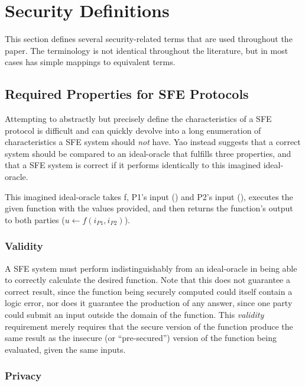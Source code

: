 \section{Security Definitions}
\label{sec:definitions}

This section defines several security-related terms that are used throughout the paper.  The terminology is not identical throughout the literature, but in most cases has simple mappings to equivalent terms.


\subsection{Required Properties for \ac{SFE} Protocols}

Attempting to abstractly but precisely define the characteristics of a \ac{SFE} protocol is difficult and can quickly devolve into a long enumeration of characteristics a \ac{SFE} system should \emph{not} have.  Yao instead suggests\cite{yao1986generate} that a correct system should be compared to an ideal-oracle that fulfills three properties, and that a \ac{SFE} system is correct if it performs identically to this imagined ideal-oracle.

This imagined ideal-oracle takes \ac{f}, \ac{P1}'s input (\ponein) and \ac{P2}'s input (\ptwoin), executes the given function with the values provided, and then returns the function's output to both parties ($u \leftarrow f(i_{P1}, i_{P2})$).


\subsubsection{Validity}

A \ac{SFE} system must perform indistinguishably from an ideal-oracle in being able to correctly calculate the desired function. Note that this does not guarantee a correct result, since the function being securely computed could itself contain a logic error, nor does it guarantee the production of any answer, since one party could submit an input outside the domain of the function. This \emph{validity} requirement merely requires that the secure version of the function produce the same result as the insecure (or ``pre-secured'') version of the function being evaluated, given the same inputs.


\subsubsection{Privacy}


